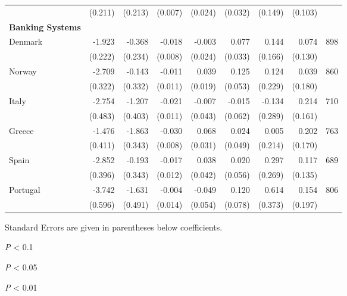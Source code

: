 \begin{table}
\begin{threeparttable}
\begin{tabularx}{8in}{X*{8}{d}}
& (0.211) &  (0.213) &   (0.007) &  (0.024) & (0.032) & (0.149) & (0.103)& \\
\textbf{Banking Systems} & & & & & & & & \\
\midrule
Denmark&-1.923\sym{***} &  -0.368 & -0.018\sym{**} &  -0.003 & 0.077\sym{**} &  0.144 &  0.074 & 898 \\
& (0.222) &  (0.234) &   (0.008) &  (0.024) & (0.033) & (0.166) & (0.130) & \\
Norway&-2.709\sym{***} &  -0.143 & -0.011 &   0.039\sym{**} & 0.125\sym{**} &  0.124 &  0.039 & 860 \\
& (0.322) &  (0.332) &   (0.011) &  (0.019) & (0.053) & (0.229) & (0.180) & \\
Italy&-2.754\sym{***} &  -1.207\sym{***} & -0.021\sym{*} &  -0.007 &-0.015 & -0.134 &  0.214 & 710 \\
& (0.483) &  (0.403) &   (0.011) &  (0.043) & (0.062) & (0.289) & (0.161) & \\
Greece &-1.476\sym{***} &  -1.863\sym{***} & -0.030\sym{***} &   0.068\sym{**} & 0.024 &  0.005 &  0.202 & 763 \\
& (0.411) &  (0.343) &   (0.008) &  (0.031) & (0.049) & (0.214) & (0.170) & \\
Spain &-2.852\sym{***} &  -0.193 & -0.017 &   0.038 & 0.020 &  0.297 &  0.117 & 689 \\
& (0.396) &  (0.343) &   (0.012) &  (0.042) & (0.056) & (0.269) & (0.135) & \\
Portugal & -3.742\sym{***} & -1.631\sym{***} & -0.004 &  -0.049 & 0.120 &  0.614 & 0.154 & 806 \\
& (0.596) & (0.491) &  (0.014) & (0.054) & (0.078) & (0.373) & (0.197) & \\
\bottomrule
\end{tabularx}
\begin{tablenotes}
\item \scriptsize{Standard Errors are given in parentheses below coefficients.}
\item \scriptsize{\sym{*} \emph{P} < 0.1}
\item \scriptsize{\sym{**} \emph{P} < 0.05}
\item \scriptsize{\sym{***} \emph{P} < 0.01}
\end{tablenotes}
\end{threeparttable}
\fontsize{10}{15}\selectfont
\end{table}
